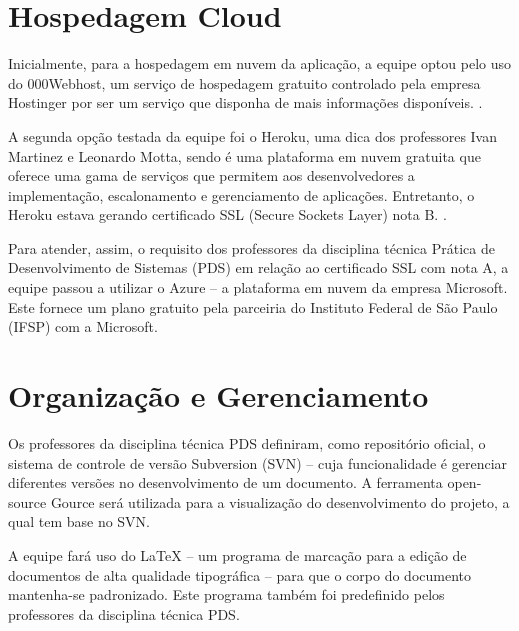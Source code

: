 \section{Hospedagem Cloud}
Inicialmente, para a hospedagem em nuvem da aplicação, a equipe optou pelo uso do 000Webhost, um serviço de hospedagem gratuito controlado pela empresa Hostinger por ser um serviço que disponha de mais informações disponíveis.  \cite{hospedagem1, hospedagem2}. 

A segunda opção testada da equipe foi o Heroku, uma dica dos professores Ivan Martinez e Leonardo Motta, sendo é uma plataforma em nuvem gratuita que oferece uma gama de serviços que permitem aos desenvolvedores a implementação, escalonamento e gerenciamento de aplicações. Entretanto, o Heroku estava gerando certificado SSL (Secure Sockets Layer) nota B. \cite{heroku}. 

Para atender, assim, o requisito dos professores da disciplina técnica Prática de Desenvolvimento de Sistemas (PDS) em relação ao certificado SSL com nota A, a equipe passou a utilizar o Azure – a plataforma em nuvem da empresa Microsoft. Este fornece um plano gratuito pela parceiria do Instituto Federal de São Paulo (IFSP) com a Microsoft. 


\section{Organização e Gerenciamento}
Os professores da disciplina técnica PDS definiram, como repositório oficial, o sistema de controle de versão Subversion (SVN) – cuja funcionalidade é gerenciar diferentes versões no desenvolvimento de um documento. A ferramenta open-source Gource será utilizada para a visualização do desenvolvimento do projeto, a qual tem base no SVN.

A equipe fará uso do LaTeX – um programa de marcação para a edição de documentos de alta qualidade tipográfica – para que o corpo do documento mantenha-se padronizado. Este programa também foi predefinido pelos professores da disciplina técnica PDS. 

